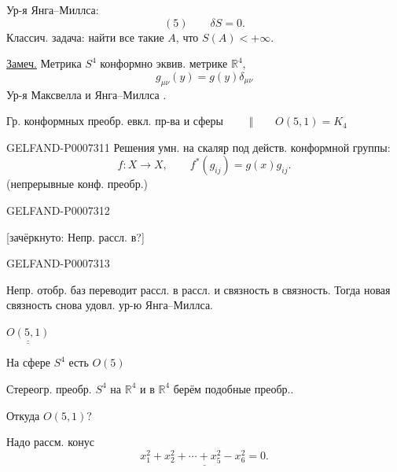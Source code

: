 Ур-я Янга--Миллса:
\[
(5)\qquad \delta S=0.
\]
Классич. задача: найти все такие \(A\), что \(S(A)<+\infty\).

\underline{Замеч.} Метрика \(S^4\) конформно эквив. метрике \(\mathbb R^4\),
\[
g_{\mu\nu}(y)=g(y)\delta_{\mu\nu}
\]
Ур-я Максвелла и Янга--Миллса .

Гр. конформных преобр. евкл. пр-ва и сферы \(\qquad\Vert\qquad O(5,1)=K_4\)


\begin{GelfandAdjacentEvidence}{GELFAND-P000731}{1}
Решения умн. на скаляр под действ. конформной группы:
\[
f:X\longrightarrow X,\qquad f^*(g_{ij})=g(x)g_{ij}.
\]
(непрерывные конф. преобр.)
\end{GelfandAdjacentEvidence}
\begin{GelfandAdjacentEvidence}{GELFAND-P000731}{2}


[зачёркнуто: Непр. рассл. в?]
\end{GelfandAdjacentEvidence}
\begin{GelfandAdjacentEvidence}{GELFAND-P000731}{3}


Непр. отобр. баз переводит рассл. в рассл. и связность в связность.
Тогда новая связность снова удовл. ур-ю Янга--Миллса.

\(\underline{\underline{O(5,1)}}\)

На сфере \(S^4\) есть \(O(5)\)

Стереогр. преобр. \(S^4\) на \(\mathbb R^4\) и в \(\mathbb R^4\) берём подобные преобр..

Откуда \(O(5,1)\)?

Надо рассм. конус
\[
\underline{x_1^2+x_2^2+\cdots+x_5^2-x_6^2=0.}
\]
\end{GelfandAdjacentEvidence}
